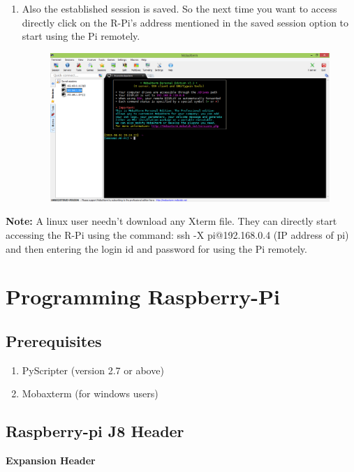 \documentclass[11pt,a4paper]{report}
\begin{document}
\begin{flushleft}
\begin{enumerate}
\begin{figure}[h]
			\centering
			\caption{}
		\end{figure}
		\newpage
		\item Also the established session is saved. So the next time you want to access directly click on the R-Pi's address mentioned in the saved session option to start using the Pi remotely.
		\begin{figure}[h!]
			\includegraphics[scale=0.3]{M5.PNG}
			\centering
			\caption{}
		\end{figure}
	\end{enumerate}

	\textbf{Note:} A linux user needn't download any Xterm file. They can directly start accessing the R-Pi using the command: ssh -X pi@192.168.0.4 (IP address of pi) and then entering the login id and password for using the Pi remotely.
	
	\newpage
	
	\chapter{Programming Raspberry-Pi }
	\section{Prerequisites}
	\begin{enumerate}
		\item PyScripter (version 2.7 or above)
		\item Mobaxterm (for windows users)
	\end{enumerate}
	\section{Raspberry-pi J8 Header }
	\textbf{Expansion Header}
	

\end{flushleft}
\end{document}
